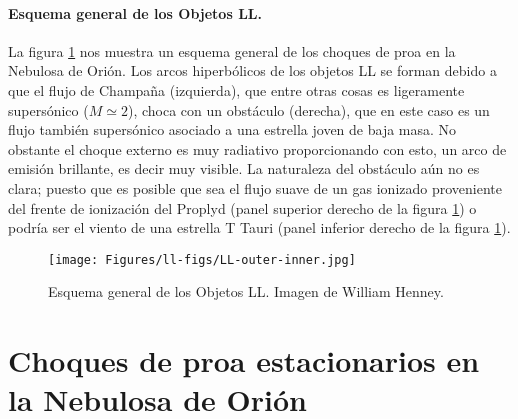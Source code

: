 \paragraph{Esquema general de los Objetos LL.} La figura \ref{fig:esquema-arcos} nos muestra un esquema general de los choques de proa en la Nebulosa de Orión. Los arcos hiperbólicos de los objetos LL se forman debido a que el flujo de Champaña (izquierda), que entre otras cosas es ligeramente supersónico (\(M\simeq2\)), choca con un obstáculo (derecha), que en este caso es un flujo también supersónico asociado a una estrella joven de baja masa. No obstante el choque externo es muy radiativo proporcionando con esto, un arco de emisión brillante, es decir muy visible. La naturaleza del obstáculo aún no es clara; puesto que es posible que sea el flujo suave de un gas ionizado proveniente del frente de ionización del Proplyd (panel superior derecho de la figura \ref{fig:esquema-arcos}) o podría ser el viento de una estrella T Tauri (panel inferior derecho de la figura \ref{fig:esquema-arcos}).\\ 

\begin{figure}
  \centering
  \texttt{[image: Figures/ll-figs/LL-outer-inner.jpg]}
  \caption{Esquema general de los Objetos LL. Imagen de William Henney.}
  \label{fig:esquema-arcos}
\end{figure}

\section{Choques de proa estacionarios en la Nebulosa de Orión}
\label{sec:shocks}

